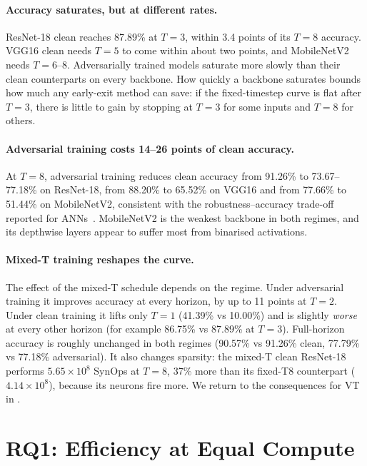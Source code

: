 \paragraph{Accuracy saturates, but at different rates.} ResNet-18 clean reaches 87.89\% at $T = 3$, within 3.4 points of its $T = 8$ accuracy. VGG16 clean needs $T = 5$ to come within about two points, and MobileNetV2 needs $T = 6$--$8$. Adversarially trained models saturate more slowly than their clean counterparts on every backbone. How quickly a backbone saturates bounds how much any early-exit method can save: if the fixed-timestep curve is flat after $T = 3$, there is little to gain by stopping at $T = 3$ for some inputs and $T = 8$ for others.

\paragraph{Adversarial training costs 14--26 points of clean accuracy.} At $T = 8$, adversarial training reduces clean accuracy from 91.26\% to 73.67--77.18\% on ResNet-18, from 88.20\% to 65.52\% on VGG16 and from 77.66\% to 51.44\% on MobileNetV2, consistent with the robustness--accuracy trade-off reported for ANNs~\cite{tsipras2019robustness}. MobileNetV2 is the weakest backbone in both regimes, and its depthwise layers appear to suffer most from binarised activations.

\paragraph{Mixed-T training reshapes the curve.} The effect of the mixed-T schedule depends on the regime. Under adversarial training it improves accuracy at every horizon, by up to 11 points at $T = 2$. Under clean training it lifts only $T = 1$ (41.39\% vs 10.00\%) and is slightly \emph{worse} at every other horizon (for example 86.75\% vs 87.89\% at $T = 3$). Full-horizon accuracy is roughly unchanged in both regimes (90.57\% vs 91.26\% clean, 77.79\% vs 77.18\% adversarial). It also changes sparsity: the mixed-T clean ResNet-18 performs $5.65 \times 10^{8}$ SynOps at $T = 8$, 37\% more than its fixed-T8 counterpart ($4.14 \times 10^{8}$), because its neurons fire more. We return to the consequences for VT in .

\section{RQ1: Efficiency at Equal Compute}
\label{sec:res-efficiency}

